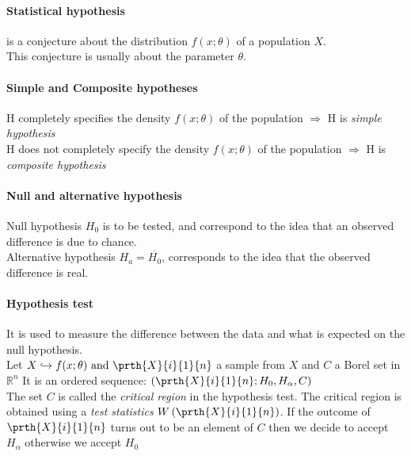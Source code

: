 \paragraph{Statistical hypothesis}
is a conjecture about the distribution $f(x;\theta)$ of a population
$X$.\\
This conjecture is usually about the parameter $\theta$.

\paragraph{Simple and Composite hypotheses}
H completely specifies the density $f(x;\theta)$ of the population 
$\Rightarrow$ H is \emph{simple hypothesis}\\
H does not completely specify the density $f(x;\theta)$ of the
population $\Rightarrow$ H is \emph{composite hypothesis}

\paragraph{Null and alternative hypothesis}
Null hypothesis $H_{0}$ is to be tested, and correspond to the idea
that an observed difference is due to chance.\\
Alternative hypothesis $H_{a} = \overline{H_{0}}$, corresponds to the
idea that the observed difference is real.

\paragraph{Hypothesis test}
It is used to measure the difference between the data and what is
expected on the null hypothesis.\\
Let $X\hookrightarrow f(x;\theta)\text{ and }\prth{X}{i}{1}{n}$ a 
sample from $X$ and $C$ a Borel set in $\mathbb{R}^{n}$
It is an ordered sequence: $\left(\prth{X}{i}{1}{n};H_{0},H_{\alpha},C\right)$\\
The set $C$ is called the \emph{critical region} in the hypothesis 
test. The critical region is obtained using a \emph{test statistics}
$W\left(\prth{X}{i}{1}{n}\right)$. If the outcome of 
$\prth{X}{i}{1}{n}$ turns out to be an element of $C$ then we decide to
accept $H_{\alpha}$ otherwise we accept $H_{0}$
